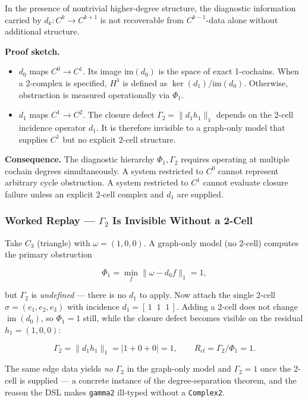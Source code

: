 \documentclass[
]{article}
\providecommand{\tightlist}{%
  \setlength{\itemsep}{0pt}\setlength{\parskip}{0pt}}
\providecommand{\tightlist}{%
  \setlength{\itemsep}{0pt}\setlength{\parskip}{0pt}}
\begin{document}
In the presence of nontrivial higher-degree structure, the diagnostic information carried by \(d_k:C^k\to C^{k+1}\) is not recoverable from \(C^{k-1}\)-data alone without additional structure.

\textbf{Proof sketch.}

\begin{itemize}
\tightlist
\item
  \(d_0\) maps \(C^0 \to C^1\). Its image \(\mathrm{im}(d_0)\) is the space of exact 1-cochains. When a 2-complex is specified, \(H^1\) is defined as \(\ker(d_1)/\mathrm{im}(d_0)\). Otherwise, obstruction is measured operationally via \(\Phi_1\).
\item
  \(d_1\) maps \(C^1 \to C^2\). The closure defect \(\Gamma_2=\|d_1h_1\|_1\) depends on the 2-cell incidence operator \(d_1\). It is therefore invisible to a graph-only model that supplies \(C^1\) but no explicit 2-cell structure.
\end{itemize}

\textbf{Consequence.} The diagnostic hierarchy \(\Phi_1, \Gamma_2\) requires operating at multiple cochain degrees simultaneously. A system restricted to \(C^0\) cannot represent arbitrary cycle obstruction. A system restricted to \(C^1\) cannot evaluate closure failure unless an explicit 2-cell complex and \(d_1\) are supplied.

\subsubsection{\texorpdfstring{Worked Replay --- \(\Gamma_2\) Is Invisible Without a 2-Cell}{Worked Replay --- \textbackslash Gamma\_2 Is Invisible Without a 2-Cell}}\label{worked-replay-gamma_2-is-invisible-without-a-2-cell}

Take \(C_3\) (triangle) with \(\omega=(1,0,0)\). A graph-only model (no 2-cell) computes the primary obstruction

\[
\Phi_1=\min_f\|\omega-d_0 f\|_1=1,
\]

but \(\Gamma_2\) is \emph{undefined} --- there is no \(d_1\) to apply. Now attach the single 2-cell \(\sigma=(e_1,e_2,e_3)\) with incidence \(d_1=[\,1\;\;1\;\;1\,]\). Adding a 2-cell does not change \(\operatorname{im}(d_0)\), so \(\Phi_1=1\) still, while the closure defect becomes visible on the residual \(h_1=(1,0,0)\):

\[
\Gamma_2=\|d_1 h_1\|_1=|1+0+0|=1,\qquad R_{cl}=\Gamma_2/\Phi_1=1.
\]

The same edge data yields \emph{no} \(\Gamma_2\) in the graph-only model and \(\Gamma_2=1\) once the 2-cell is supplied --- a concrete instance of the degree-separation theorem, and the reason the DSL makes \texttt{gamma2} ill-typed without a \texttt{Complex2}.
\end{document}
